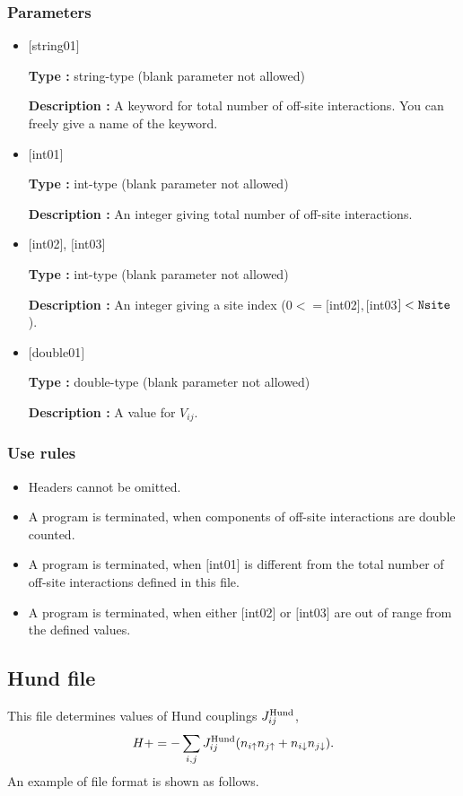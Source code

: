 \subsubsection{Parameters}
 \begin{itemize}

   \item  $[$string01$]$
   
    {\bf Type :} string-type (blank parameter not allowed)

   {\bf Description :} A keyword for total number of off-site interactions. You can freely give a name of the keyword.

   \item  $[$int01$]$
   
    {\bf Type :} int-type (blank parameter not allowed)

   {\bf Description :}  An integer giving total number of off-site interactions.

  \item  $[$int02$]$, $[$int03$]$
  
 {\bf Type :} int-type (blank parameter not allowed)

{\bf Description :} An integer giving a site index ($0<= [$int02$], [$int03$]<\verb|Nsite|$).
 
 \item  $[$double01$]$
   
   {\bf Type :} double-type (blank parameter not allowed)

  {\bf Description :}  A value for $V_{ij}$.
  
\end{itemize}

\subsubsection{Use rules}
\begin{itemize}
\item Headers cannot be omitted. 
\item A program is terminated, when components of off-site interactions are double counted.
\item A program is terminated, when $[$int01$]$ is different from the total number of off-site interactions defined in this file.
\item A program is terminated, when either $[$int02$]$ or $[$int03$]$ are out of range from the defined values.
\end{itemize}

\newpage
\subsection{Hund file}
This file determines values of Hund couplings $J_{ij}^{\rm Hund}$,
\begin{equation}
H+=-\sum_{i,j}J_{ij}^{\rm Hund} (n_{i\uparrow}n_{j\uparrow}+n_{i\downarrow}n_{j\downarrow}).
\end{equation}
An example of file format is shown as follows.

